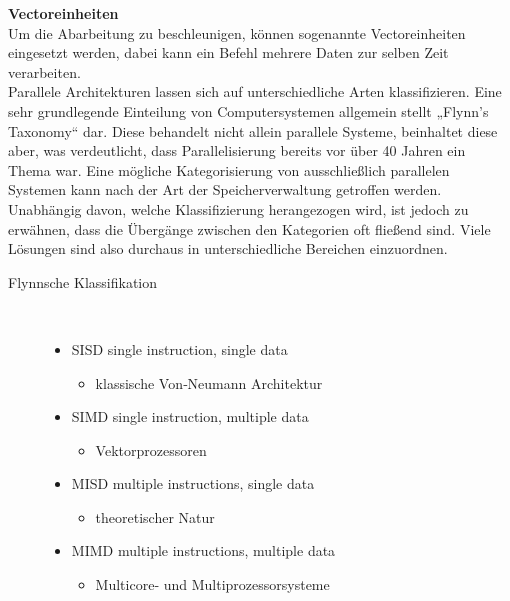 \documentclass[a4paper,12pt]{article}
\begin{document}
\textbf{Vectoreinheiten\\}
Um die Abarbeitung zu beschleunigen, können sogenannte Vectoreinheiten eingesetzt werden, dabei kann ein Befehl mehrere Daten zur selben Zeit verarbeiten.\\
Parallele Architekturen lassen sich auf unterschiedliche Arten klassifizieren. Eine sehr grundlegende Einteilung von Computersystemen allgemein stellt „Flynn’s Taxonomy“ dar. Diese behandelt nicht allein parallele Systeme, beinhaltet diese aber, was verdeutlicht, dass Parallelisierung bereits vor über 40 Jahren ein Thema war.
\newpage
\noindent
Eine mögliche Kategorisierung von ausschließlich parallelen Systemen kann nach der Art der Speicherverwaltung getroffen werden.
Unabhängig davon, welche Klassifizierung herangezogen wird, ist jedoch zu erwähnen, dass die Übergänge zwischen den Kategorien oft fließend sind. Viele Lösungen sind also durchaus in unterschiedliche Bereichen einzuordnen.
\begin{description}
    \item[Flynnsche Klassifikation] ~\par
    \begin{itemize}
        \item SISD single instruction, single data
        \begin{itemize}
            \item{klassische Von‑Neumann Architektur}
        \end{itemize}
        \item SIMD single instruction, multiple data
        \begin{itemize}
            \item{Vektorprozessoren}
        \end{itemize}
        \item MISD multiple instructions, single data
        \begin{itemize}
            \item{theoretischer Natur}
        \end{itemize}
        \item MIMD multiple instructions, multiple data
        \begin{itemize}
            \item{Multicore‑ und Multiprozessorsysteme\\\\}
        \end{itemize}
    \end{itemize} 
\end{description}
\end{document}
